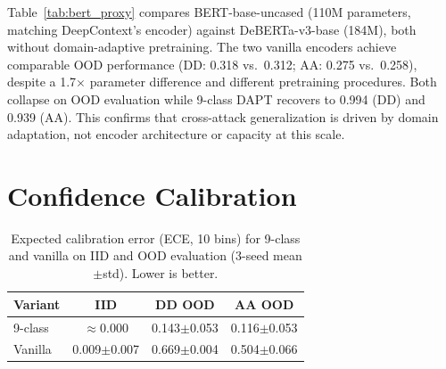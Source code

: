 \begin{table}[ht]
\centering
\footnotesize
\caption{BERT-base-uncased (110M) frozen probing without DAPT, matching DeepContext's encoder family~\citep{deepcontext2026}. 3-seed mean$\pm$std. DeBERTa-v3 results from Table~\ref{tab:cross_encoder} for comparison.}
\label{tab:bert_proxy}
\end{table}

Table~\ref{tab:bert_proxy} compares BERT-base-uncased (110M parameters, matching DeepContext's encoder) against DeBERTa-v3-base (184M), both without domain-adaptive pretraining. The two vanilla encoders achieve comparable OOD performance (DD: 0.318 vs.\ 0.312; AA: 0.275 vs.\ 0.258), despite a 1.7$\times$ parameter difference and different pretraining procedures. Both collapse on OOD evaluation while 9-class DAPT recovers to 0.994 (DD) and 0.939 (AA). This confirms that cross-attack generalization is driven by domain adaptation, not encoder architecture or capacity at this scale.

\section{Confidence Calibration}
\label{app:calibration}

\begin{table}[ht]
\centering
\footnotesize
\caption{Expected calibration error (ECE, 10 bins) for 9-class and vanilla on IID and OOD evaluation (3-seed mean$\pm$std). Lower is better.}
\label{tab:calibration}
\begin{tabular}{@{}lccc@{}}
\toprule
\textbf{Variant} & IID & DD OOD & AA OOD \\
\midrule
9-class & $\approx$0.000 & 0.143$\pm$0.053 & 0.116$\pm$0.053 \\
Vanilla & 0.009$\pm$0.007 & 0.669$\pm$0.004 & 0.504$\pm$0.066 \\
\bottomrule
\end{tabular}
\end{table}

